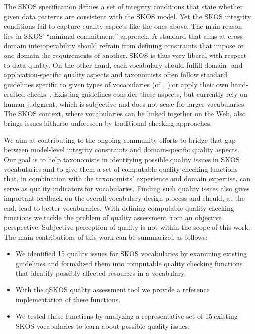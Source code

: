 The SKOS specification defines a set of integrity conditions that state whether given data patterns are consistent with the SKOS model. Yet the SKOS integrity conditions fail to capture quality aspects like the ones above. The main reason lies in SKOS' ``minimal commitment'' approach. A standard that aims at cross-domain interoperability should refrain from defining constraints that impose on one domain the requirements of another. SKOS is thus very liberal with respect to data quality. On the other hand, each vocabulary should fulfill domain- and application-specific quality aspects and taxonomists often follow standard guidelines specific to given types of vocabularies (cf.,~\cite{ISO25964-1:2011,Z39.19:2005}) or apply their own hand-crafted checks~\cite{Coronado2009}. Existing guidelines consider these aspects, but currently rely on human judgment, which is subjective and does not scale for larger vocabularies. The SKOS context, where vocabularies can be linked together on the Web, also brings issues hitherto unforeseen by traditional checking approaches.


We aim at contributing to the ongoing community efforts to bridge that gap between model-level integrity constraints and domain-specific quality aspects. Our goal is to help taxonomists in identifying possible quality issues in SKOS vocabularies and to give them a set of computable quality checking functions that, in combination with the taxonomists' experience and domain expertise, can serve as quality indicators for vocabularies. Finding such quality issues also gives important feedback on the overall vocabulary design process and should, at the end, lead to better vocabularies. With defining computable quality checking functions we tackle the problem of quality assessment from an objective perspective. Subjective perception of quality is not within the scope of this work. The main contributions of this work can be summarized as follows:

\begin{itemize}

	\item We identified 15 quality issues for SKOS vocabularies by examining existing guidelines and formalized them into computable quality checking functions that identify possibly affected resources in a vocabulary.
	
	\item With the qSKOS quality assessment tool we provide a reference implementation of these functions.

	\item We tested these functions by analyzing a representative set of 15 existing SKOS vocabularies to learn about possible quality issues.

\end{itemize}

